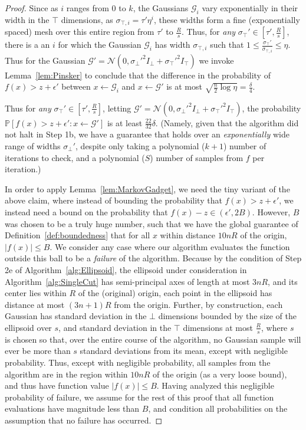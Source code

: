 \documentclass[11pt,letter]{article}
\renewcommand{\Pr}{\mathbb{P}}
\newcommand{\from}{\leftarrow}
\newcommand{\Normal}{\mathcal{N}}
\newcommand{\ferr}{\epsilon}
\newcommand{\perr}{\delta}
\newcommand{\safety}{s}
\numberwithin{nTheorems}{section}
\begin{document}
\begin{proof}
Since as $i$ ranges from $0$ to $k$, the Gaussians $\mathcal{G}_i$ vary exponentially in their width in the $\top$ dimensions, as $\sigma_{\top,i}=\tau'\eta^i$, these widths form a fine (exponentially spaced) mesh over this entire region from $\tau'$ to $\frac{R}{\safety}$. Thus, for \emph{any} $\sigma_\top'\in [\tau',\frac{R}{\safety}]$, there is a an $i$ for which the Gaussian $\mathcal{G}_i$ has width $\sigma_{\top,i}$ such that $1\leq \frac{\sigma_\top'}{\sigma_{\top,i}}\leq \eta$. Thus for the Gaussian $\mathcal{G}'=\Normal(0, \sigma_\bot'^2 I_\bot + \sigma_\top'^2 I_\top)$ we invoke Lemma~\ref{lem:Pinsker} to conclude that the difference in the probability of $f(x)>z+\ferr'$ between $x\from \mathcal{G}_i$ and $x\from \mathcal{G}'$ is at most $\sqrt{\frac{n}{2}\log\eta}=\frac{\perr}{4}$.

Thus for \emph{any} $\sigma_\top'\in [\tau',\frac{R}{\safety}]$, letting $\mathcal{G}'=\Normal(0, \sigma_\bot'^2 I_\bot + \sigma_\top'^2 I_\top)$, the probability $\Pr[f(x)>z+\ferr':x\from\mathcal{G}']$ is at least $\frac{22}{32}\perr$. (Namely, given that the algorithm did not halt in Step 1b, we have a guarantee that holds over an \emph{exponentially} wide range of widths $\sigma_\bot'$, despite only taking a polynomial ($k+1$) number of iterations to check, and a polynomial ($S$) number of samples from $f$ per iteration.)


In order to apply Lemma~\ref{lem:MarkovGadget}, we need the tiny variant of the above claim, where instead of bounding the probability that $f(x)>z+\ferr'$, we instead need a bound on the probability that $f(x)-z \in (\ferr',2B)$. However, $B$ was chosen to be a truly huge number, such that we have the global guarantee of Definition~\ref{def:boundedness} that for all $x$ within distance $10nR$ of the origin, $|f(x)|\leq B$. We consider any case where our algorithm evaluates the function outside this ball to be a \emph{failure} of the algorithm. Because by the condition of Step 2e of Algorithm~\ref{alg:Ellipsoid}, the ellipsoid under consideration in Algorithm~\ref{alg:SingleCut} has semi-principal axes of length at most $3nR$, and its center lies within $R$ of the (original) origin, each point in the ellipsoid has distance at most $(3n+1)R$ from the origin. Further, by construction, each Gaussian has standard deviation in the $\bot$ dimensions bounded by the size of the ellipsoid over $s$, and standard deviation in the $\top$ dimensions at most $\frac{R}{s}$, where $s$ is chosen so that, over the entire course of the algorithm, no Gaussian sample will ever be more than $s$ standard deviations from its mean, except with negligible probability. Thus, except with negligible probability, all samples from the algorithm are in the region within $10nR$ of the origin (as a very loose bound), and thus have function value $|f(x)|\leq B$. Having analyzed this negligible probability of failure, we assume for the rest of this proof that all function evaluations have magnitude less than $B$, and condition all probabilities on the assumption that no failure has occurred.


\end{proof}
\end{document}
